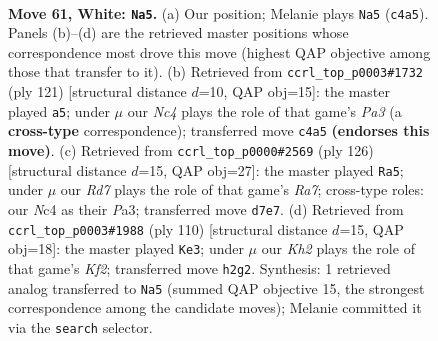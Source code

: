 \documentclass[11pt]{article}
\begin{document}
\clearpage

\begin{figure}[p]\centering
\begin{subfigure}{0.46\textwidth}\centering
\resizebox{\linewidth}{!}{%
\newchessgame
\chessboard[
  setfen={8/3R2p1/5pk1/7p/2NP3P/6P1/7K/2r5 w - - 15 61},
  showmover=false,
  pgfstyle=straightmove, color=movearrow, markmove={c4-a5}
]}
\caption{}
\end{subfigure}\hfill
\begin{subfigure}{0.46\textwidth}\centering
\resizebox{\linewidth}{!}{%
\newchessgame
\chessboard[
  setfen={8/6pk/p3R3/7p/7P/5PK1/r5P1/8 b - - 11 61},
  showmover=false,
  pgfstyle=straightmove, color=movearrow, markmove={a6-a5}
]}
\caption{}
\end{subfigure}
\\[4pt]
\begin{subfigure}{0.46\textwidth}\centering
\resizebox{\linewidth}{!}{%
\newchessgame
\chessboard[
  setfen={8/R4p2/5kp1/7p/7P/Pr6/6PK/8 w - - 0 64},
  showmover=false,
  pgfstyle=straightmove, color=movearrow, markmove={a7-a5}
]}
\caption{}
\end{subfigure}\hfill
\begin{subfigure}{0.46\textwidth}\centering
\resizebox{\linewidth}{!}{%
\newchessgame
\chessboard[
  setfen={8/7r/3p2R1/3kp2p/7P/5PP1/5K2/8 w - - 0 56},
  showmover=false,
  pgfstyle=straightmove, color=movearrow, markmove={f2-e3}
]}
\caption{}
\end{subfigure}
\caption{\textbf{Move 61, White: \texttt{Na5}.} (a) Our position; Melanie plays \texttt{Na5} (\texttt{c4a5}). Panels (b)--(d) are the retrieved master positions whose correspondence most drove this move (highest QAP objective among those that transfer to it). (b) Retrieved from \texttt{ccrl\_top\_p0003\#1732} (ply 121) [structural distance $d$=10, QAP obj=15]: the master played \texttt{a5}; under $\mu$ our \emph{Nc4} plays the role of that game's \emph{Pa3} (a \textbf{cross-type} correspondence); transferred move \texttt{c4a5} \textbf{(endorses this move)}. (c) Retrieved from \texttt{ccrl\_top\_p0000\#2569} (ply 126) [structural distance $d$=15, QAP obj=27]: the master played \texttt{Ra5}; under $\mu$ our \emph{Rd7} plays the role of that game's \emph{Ra7}; cross-type roles: our \emph{N}c4 as their \emph{P}a3; transferred move \texttt{d7e7}. (d) Retrieved from \texttt{ccrl\_top\_p0003\#1988} (ply 110) [structural distance $d$=15, QAP obj=18]: the master played \texttt{Ke3}; under $\mu$ our \emph{Kh2} plays the role of that game's \emph{Kf2}; transferred move \texttt{h2g2}. Synthesis: 1 retrieved analog transferred to \texttt{Na5} (summed QAP objective 15, the strongest correspondence among the candidate moves); Melanie committed it via the \texttt{search} selector.}
\label{fig:thought-m120}
\end{figure}
\end{document}
